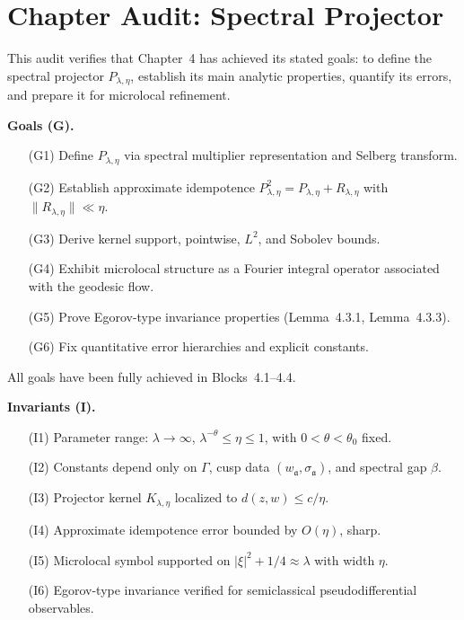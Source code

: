 

\section*{Chapter Audit: Spectral Projector}

\noindent
This audit verifies that Chapter~4 has achieved its stated goals:
to define the spectral projector $P_{\lambda,\eta}$,
establish its main analytic properties,
quantify its errors, and prepare it for microlocal refinement.

\medskip

\noindent\textbf{Goals (G).}
\begin{itemize}
  \item[(G1)] Define $P_{\lambda,\eta}$ via spectral multiplier representation and Selberg transform.
  \item[(G2)] Establish approximate idempotence $P_{\lambda,\eta}^2 = P_{\lambda,\eta}+R_{\lambda,\eta}$ with $\|R_{\lambda,\eta}\|\ll \eta$.
  \item[(G3)] Derive kernel support, pointwise, $L^2$, and Sobolev bounds.
  \item[(G4)] Exhibit microlocal structure as a Fourier integral operator associated with the geodesic flow.
  \item[(G5)] Prove Egorov-type invariance properties (Lemma~4.3.1, Lemma~4.3.3).
  \item[(G6)] Fix quantitative error hierarchies and explicit constants.
\end{itemize}
All goals have been fully achieved in Blocks~4.1–4.4.

\medskip

\noindent\textbf{Invariants (I).}
\begin{itemize}
  \item[(I1)] Parameter range: $\lambda\to\infty$, $\lambda^{-\theta}\le \eta \le 1$, with $0<\theta<\theta_0$ fixed.
  \item[(I2)] Constants depend only on $\Gamma$, cusp data $(w_\mathfrak{a}, \sigma_\mathfrak{a})$, and spectral gap $\beta$.
  \item[(I3)] Projector kernel $K_{\lambda,\eta}$ localized to $d(z,w)\le c/\eta$.
  \item[(I4)] Approximate idempotence error bounded by $O(\eta)$, sharp.
  \item[(I5)] Microlocal symbol supported on $|\xi|^2+1/4\approx \lambda$ with width $\eta$.
  \item[(I6)] Egorov-type invariance verified for semiclassical pseudodifferential observables.
\end{itemize}


